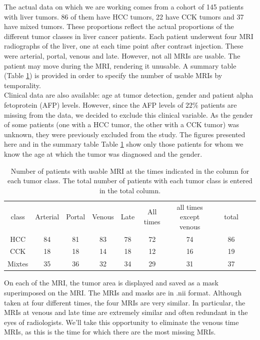 \documentclass[preprint,12pt]{elsarticle}
\begin{document}
\noindent The actual data on which we are working comes from a cohort of 145 patients with liver tumors. 86 of them have HCC tumors, 22 have CCK tumors and 37 have mixed tumors. These proportions reflect the actual proportions of the different tumor classes in liver cancer patients. Each patient underwent four MRI radiographs of the liver, one at each time point after contrast injection. These were arterial, portal, venous and late. However, not all MRIs are usable. The patient may move during the MRI, rendering it unusable. A summary table (Table \ref{tab:nb_tumeurs}) is provided in order to specify the number of usable MRIs by temporality.\\
\indent Clinical data are also available: age at tumor detection, gender and patient alpha fetoprotein (AFP) levels. However, since the AFP levels of $22\%$ patients are missing from the data, we decided to exclude this clinical variable. As the gender of some patients (one with a HCC tumor, the other with a CCK tumor) was unknown, they were previously excluded from the study. The figures presented here and in the summary table Table \ref{tab:nb_tumeurs} show only those patients for whom we know the age at which the tumor was diagnosed and the gender.\\
\begin{table}[tbp]
    \centering
    \caption{Number of patients with usable MRI at the times indicated in the column for each tumor class. The total number of patients with each tumor class is entered in the total column.}
    \label{tab:nb_tumeurs}
    \begin{tabular}{|c|c|c|c|c|c|c|c|c|c|c|}
        \cline{1-7} \cline{9-9}
        class & Arterial & Portal & Venous & Late & All times & all times except venous& & total \\
        \cline{1-7} \cline{9-9}
        HCC & 84 & 81 & 83 & 78 & 72 & 74 & & 86\\
        \cline{1-7} \cline{9-9}
        CCK & 18 & 18 & 14 & 18 & 12 & 16 & & 19\\
        \cline{1-7} \cline{9-9}
        Mixtes & 35 & 36 & 32 & 34 & 29 & 31 & & 37\\
        \cline{1-7} \cline{9-9}
    \end{tabular}
\end{table}
\indent On each of the MRI, the tumor area is displayed and saved as a mask superimposed on the MRI. The MRIs and masks are in .nii format. Although taken at four different times, the four MRIs are very similar. In particular, the MRIs at venous and late time are extremely similar and often redundant in the eyes of radiologists. We'll take this opportunity to eliminate the venous time MRIs, as this is the time for which there are the most missing MRIs.
\end{document}
